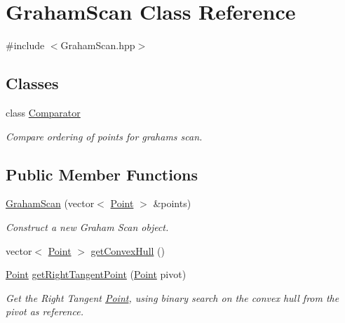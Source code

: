 \hypertarget{classGrahamScan}{}\section{Graham\+Scan Class Reference}
\label{classGrahamScan}


{\ttfamily \#include $<$Graham\+Scan.\+hpp$>$}

\subsection*{Classes}
\begin{DoxyCompactItemize}
\item 
class \mbox{\hyperlink{classGrahamScan_1_1Comparator}{Comparator}}
\begin{DoxyCompactList}\small\item\em Compare ordering of points for graham\textquotesingle{}s scan. \end{DoxyCompactList}\end{DoxyCompactItemize}
\subsection*{Public Member Functions}
\begin{DoxyCompactItemize}
\item 
\mbox{\hyperlink{classGrahamScan_aa774467ce21242d7ef7ffbd1680a6d61}{Graham\+Scan}} (vector$<$ \mbox{\hyperlink{classPoint}{Point}} $>$ \&points)
\begin{DoxyCompactList}\small\item\em Construct a new Graham Scan object. \end{DoxyCompactList}\item 
vector$<$ \mbox{\hyperlink{classPoint}{Point}} $>$ \mbox{\hyperlink{classGrahamScan_a374db012cb6a96fcb8530d07cddd498e}{get\+Convex\+Hull}} ()
\item 
\mbox{\hyperlink{classPoint}{Point}} \mbox{\hyperlink{classGrahamScan_ae01e3fe104346f991f951a6843a15893}{get\+Right\+Tangent\+Point}} (\mbox{\hyperlink{classPoint}{Point}} pivot)
\begin{DoxyCompactList}\small\item\em Get the Right Tangent \mbox{\hyperlink{classPoint}{Point}}, using binary search on the convex hull from the pivot as reference. \end{DoxyCompactList}\end{DoxyCompactItemize}
